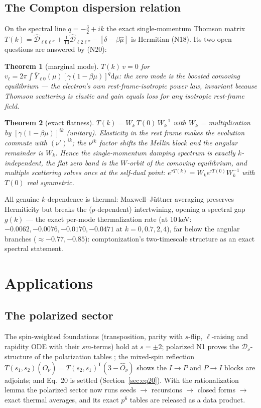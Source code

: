 \documentclass[useAMS,usenatbib]{article}
\newcommand{\Oh}{\hat{O}_\nu}
\newcommand{\Dv}{\hat{\mathcal{D}}_\nu}
\newcommand{\Do}{\hat{\mathcal{D}}}
\newcommand{\dd}{\mathrm{d}}
\newtheorem{theorem}{Theorem}
\begin{document}
\subsection{The Compton dispersion relation}\label{sec:dispersion}
On the spectral line $q = -\tfrac32+ik$ the exact single-momentum Thomson matrix
$T(k) = \Do_{\ell0\ell''} + \tfrac1{10}\Do_{\ell2\ell''} - [\delta - \beta\hat\mu]$ is Hermitian (N18). Its two
open questions are answered by (N20):
\begin{theorem}[marginal mode]
$T(k)\,v = 0$ for $v_\ell = 2\pi\int\bar Y_{\ell0}(\mu)[\gamma(1-\beta\mu)]^{q}\dd\mu$: the zero mode is the
\emph{boosted comoving equilibrium} --- the electron's own rest-frame-isotropic power law, invariant because
Thomson scattering is elastic and gain equals loss for any isotropic rest-frame field.
\end{theorem}
\begin{theorem}[exact flatness]
$T(k) = W_k\,T(0)\,W_k^{-1}$ with $W_k$ = multiplication by $[\gamma(1-\beta\mu)]^{ik}$ (unitary). Elasticity in
the rest frame makes the evolution commute with $(\nu')^{ik}$; the $\nu^{ik}$ factor shifts the Mellin block and
the angular remainder is $W_k$. Hence the single-momentum damping spectrum is exactly $k$-independent, the flat
zero band is the $W$-orbit of the comoving equilibrium, and multiple scattering solves once at the self-dual
point: $e^{\tau T(k)} = W_ke^{\tau T(0)}W_k^{-1}$ with $T(0)$ real symmetric.
\end{theorem}
All genuine $k$-dependence is thermal: Maxwell--J\"uttner averaging preserves Hermiticity but breaks the
($p$-dependent) intertwining, opening a spectral gap $g(k)$ --- the exact per-mode thermalization rate (at
10\,keV: $-0.0062, -0.0076, -0.0170, -0.0471$ at $k = 0, 0.7, 2, 4$), far below the angular branches
($\approx-0.77,-0.85$): comptonization's two-timescale structure as an exact spectral statement.

\section{Applications}\label{sec:applications}

\subsection{The polarized sector}
The spin-weighted foundations (transposition, parity with $s$-flip, $\ell$-raising and rapidity ODE with their
$sm$-terms) hold at $s=\pm2$; polarized N1 proves the $\Dv$-structure of the polarization tables
\citep[Eq.~21a]{RC26}; the mixed-spin reflection $T(s_1,s_2)(\Oh) = T(s_2,s_1)^{\mathsf T}(3-\Oh)$ shows the
$I\!\to\!P$ and $P\!\to\!I$ blocks are adjoints; and Eq.~20 is settled (Section~\ref{sec:eq20}). With the
rationalization lemma the polarized sector now runs seeds $\to$ recursions $\to$ closed forms $\to$ exact
thermal averages, and its exact $p^6$ tables are released as a data product.
\end{document}
